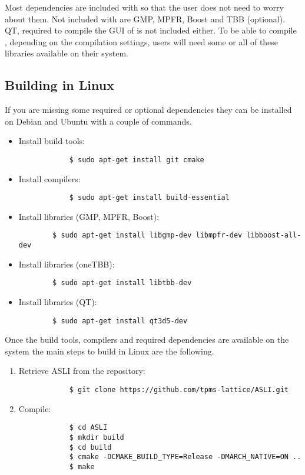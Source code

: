 Most dependencies are included with \asli{} so that the user does not need to worry about them. Not included with \asli{} are GMP, MPFR, Boost and TBB (optional). QT, required to compile the GUI of \asli{} is not included either. To be able to compile \asli{}, depending on the compilation settings, users will need some or all of these libraries available on their system.

\subsection{Building \asli{} in Linux}\label{sec:buildLin}

If you are missing some required or optional dependencies they can be installed on Debian and Ubuntu with a couple of commands.

\begin{itemize}
	\item Install build tools:
		\begin{verbatim}
			$ sudo apt-get install git cmake
		\end{verbatim}

	\item Install compilers:
		\begin{verbatim}
			$ sudo apt-get install build-essential
		\end{verbatim}

	\item Install libraries (GMP, MPFR, Boost):
	\begin{verbatim}
		$ sudo apt-get install libgmp-dev libmpfr-dev libboost-all-dev
	\end{verbatim}

	\item Install libraries (oneTBB):
	\begin{verbatim}
		$ sudo apt-get install libtbb-dev
	\end{verbatim}

	\item Install libraries (QT):
	\begin{verbatim}
		$ sudo apt-get install qt3d5-dev
	\end{verbatim}
\end{itemize}

Once the build tools, compilers and required dependencies are available on the system the main steps to build \asli{} in Linux are the following.
\begin{enumerate}
	\item Retrieve ASLI from the repository:
		\begin{verbatim}
			$ git clone https://github.com/tpms-lattice/ASLI.git
		\end{verbatim}
	\item Compile:
		\begin{verbatim}
			$ cd ASLI
			$ mkdir build
			$ cd build
			$ cmake -DCMAKE_BUILD_TYPE=Release -DMARCH_NATIVE=ON ..
			$ make
		\end{verbatim}
\end{enumerate}

